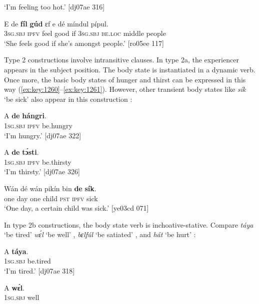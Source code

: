 \glt ‘I’m feeling too hot.’ [dj07ae 316]
\z


\ea%
    \label{ex:key:1259}
    \gll E    de  \textbf{fíl}  \textbf{gúd}    ɛf  e    dé    míndul  pípul.\\
\textsc{3sg.sbj}  \textsc{ipfv}  feel  good  if  \textsc{3sg.sbj}  \textsc{be.loc}  middle  people\\

\glt ‘She feels good if she’s amongst people.’ [ro05ee 117]
\z

Type 2 constructions involve intransitive clauses. In type 2a, the experiencer appears in the subject position. The body state is instantiated in a dynamic verb. Once more, the basic body states of hunger and thirst can be expressed in this way (\ref{ex:key:1260}–\ref{ex:key:1261}). However, other transient body states like \textit{sík} ‘be sick’ also appear in this construction : 


\ea%
    \label{ex:key:1260}
    \gll A    \textbf{de}  \textbf{hángri}.\\
\textsc{1sg.sbj}  \textsc{ipfv}  be.hungry\\

\glt ‘I’m hungry.’ [dj07ae 322]
\z


\ea%
    \label{ex:key:1261}
    \gll A    \textbf{de}  \textbf{tɔ́sti}.\\
\textsc{1sg.sbj}  \textsc{ipfv}  be.thirsty\\

\glt ‘I’m thirsty.’ [dj07ae 326]
\z


\ea%
    \label{ex:key:1262}
    \gll Wán    dé  wán    pikín  bin  \textbf{de}  \textbf{sík}.\\
one    day  one    child  \textsc{pst}  \textsc{ipfv}  sick\\

\glt ‘One day, a certain child was sick.’ [ye03cd 071]
\z

In type 2b constructions, the body state verb is inchoative-stative. Compare \textit{táya} ‘be tired’  \textit{wɛ́l} ‘be well’ , \textit{bɛlfúl} ‘be satiated’ , and \textit{hát} ‘be hurt’ :


\ea%
    \label{ex:key:1263}
    \gll A    \textbf{táya}.\\
\textsc{1sg.sbj}  be.tired\\

\glt ‘I’m tired.’ [dj07ae 318]
\z


\ea%
    \label{ex:key:1264}
    \gll A    \textbf{wɛ́l}.\\
\textsc{1sg.sbj}  well\\

